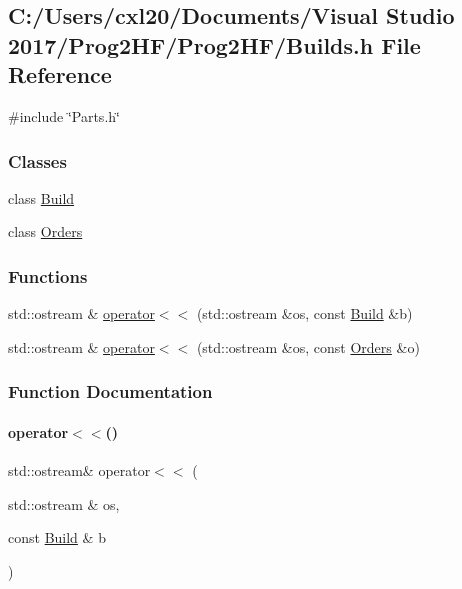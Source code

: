 \subsection{C\+:/\+Users/cxl20/\+Documents/\+Visual Studio 2017/\+Prog2\+H\+F/\+Prog2\+H\+F/\+Builds.h File Reference}
\label{_builds_8h}
{\ttfamily \#include \char`\"{}Parts.\+h\char`\"{}}\newline
\subsubsection*{Classes}
\begin{DoxyCompactItemize}
\item 
class \mbox{\hyperlink{class_build}{Build}}
\item 
class \mbox{\hyperlink{class_orders}{Orders}}
\end{DoxyCompactItemize}
\subsubsection*{Functions}
\begin{DoxyCompactItemize}
\item 
std\+::ostream \& \mbox{\hyperlink{_builds_8h_a8dc72915bcebaea777be339661524cb9}{operator$<$$<$}} (std\+::ostream \&os, const \mbox{\hyperlink{class_build}{Build}} \&b)
\item 
std\+::ostream \& \mbox{\hyperlink{_builds_8h_a5fb6be27fb40218ba8338cb8727178cd}{operator$<$$<$}} (std\+::ostream \&os, const \mbox{\hyperlink{class_orders}{Orders}} \&o)
\end{DoxyCompactItemize}


\subsubsection{Function Documentation}
\mbox{\label{_builds_8h_a8dc72915bcebaea777be339661524cb9}} 
\paragraph{\texorpdfstring{operator$<$$<$()}{operator<<()}\hspace{0.1cm}{\footnotesize\ttfamily [1/2]}}
{\footnotesize\ttfamily std\+::ostream\& operator$<$$<$ (\begin{DoxyParamCaption}\item[{std\+::ostream \&}]{os,  }\item[{const \mbox{\hyperlink{class_build}{Build}} \&}]{b }\end{DoxyParamCaption})}

